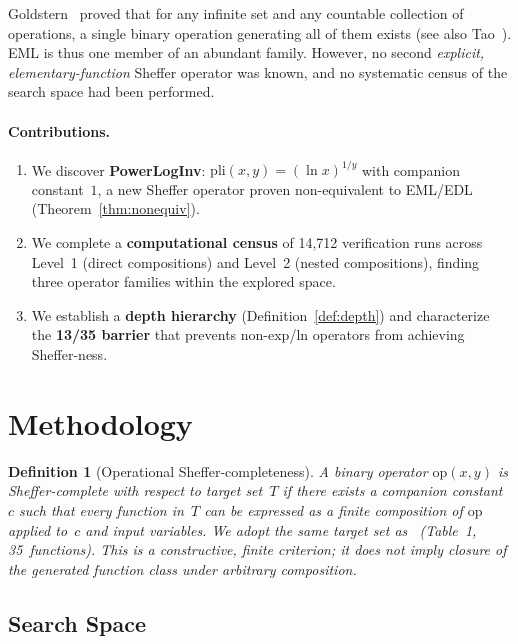 \documentclass[10pt,twocolumn]{article}
\newtheorem{definition}{Definition}
\theoremstyle{remark}
\begin{document}
Goldstern~\cite{goldstern2010} proved that for any infinite set and any countable collection of operations, a single binary operation generating all of them exists (see also Tao~\cite{tao_mo}). EML is thus one member of an abundant family. However, no second \emph{explicit, elementary-function} Sheffer operator was known, and no systematic census of the search space had been performed.

\paragraph{Contributions.}
\begin{enumerate}
\item We discover \textbf{PowerLogInv}: $\mathrm{pli}(x,y) = (\ln x)^{1/y}$ with companion constant~$1$, a new Sheffer operator proven non-equivalent to EML/EDL (Theorem~\ref{thm:nonequiv}).
\item We complete a \textbf{computational census} of 14{,}712 verification runs across Level~1 (direct compositions) and Level~2 (nested compositions), finding three operator families within the explored space.
\item We establish a \textbf{depth hierarchy} (Definition~\ref{def:depth}) and characterize the \textbf{13/35 barrier} that prevents non-exp/ln operators from achieving Sheffer-ness.
\end{enumerate}

\section{Methodology}

\begin{definition}[Operational Sheffer-completeness]
A binary operator $\mathrm{op}(x,y)$ is \emph{Sheffer-complete with respect to target set~$T$} if there exists a companion constant~$c$ such that every function in~$T$ can be expressed as a finite composition of $\mathrm{op}$ applied to~$c$ and input variables. We adopt the same target set as~\cite{odrzywołek2026} (Table~1, 35~functions). This is a constructive, finite criterion; it does not imply closure of the generated function class under arbitrary composition.
\end{definition}

\subsection{Search Space}
\end{document}
